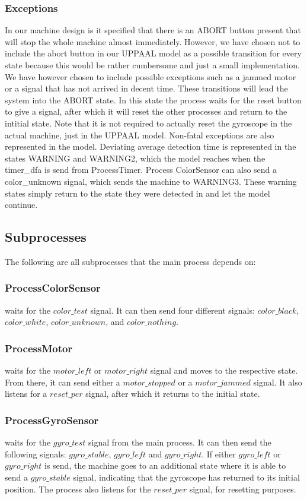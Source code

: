 \documentclass[a4paper,oneside,11pt]{article}
\begin{document}
\subsubsection{Exceptions}
In our machine design is it specified that there is an ABORT button present that will stop the whole machine almost immediately. However, we have chosen not to include the abort button in our UPPAAL model as a possible transition for every state because this would be rather cumbersome and just a small implementation. We have however chosen to include possible exceptions such as a jammed motor or a signal that has not arrived in decent time. These transitions will lead the system into the ABORT state. In this state the process waits for the reset button to give a signal, after which it will reset the other processes and return to the intitial state. Note that it is not required to actually reset the gyroscope in the actual machine, just in the UPPAAL model. Non-fatal exceptions are also represented in the model. Deviating average detection time is represented in the states WARNING and WARNING2, which the model reaches when the timer\_dfa is send from ProcessTimer. Process ColorSensor can also send a color\_unknown signal, which sends the machine to WARNING3. These warning states simply return to the state they were detected in and let the model continue.

\subsection{Subprocesses}
The following are all subprocesses that the main process depends on:

\subsubsection{ProcessColorSensor} waits for the $color\_test$ signal. It can then send four different signals: $color\_black$, $color\_white$, $color\_unknown$, and $color\_nothing$.

\subsubsection{ProcessMotor} waits for the $motor\_left$ or $motor\_right$ signal and moves to the respective state. From there, it can send either a $motor\_stopped$ or a $motor\_jammed$ signal. It also listens for a $reset\_per$ signal, after which it returns to the initial state.

\subsubsection{ProcessGyroSensor} waits for the $gyro\_test$ signal from the main process. It can then send the following signals: $gyro\_stable$, $gyro\_left$ and $gyro\_right$. If either $gyro\_left$ or $gyro\_right$ is send, the machine goes to an additional state where it is able to send a $gyro\_stable$ signal, indicating that the gyroscope has returned to its initial position. The process also listens for the $reset\_per$ signal, for resetting purposes.
\end{document}

